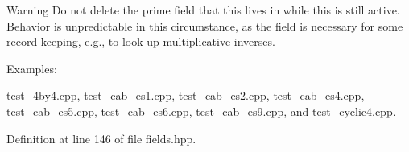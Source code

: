 \begin{DoxyWarning}{Warning}
Do not delete the prime field that {\ttfamily this} lives in while {\ttfamily this} is still active. Behavior is unpredictable in this circumstance, as the field is necessary for some record keeping, e.\+g., to look up multiplicative inverses. 
\end{DoxyWarning}
\begin{Desc}
\item[Examples\+: ]\par
\hyperlink{test_4by4_8cpp-example}{test\+\_\+4by4.\+cpp}, \hyperlink{test_cab_es1_8cpp-example}{test\+\_\+cab\+\_\+es1.\+cpp}, \hyperlink{test_cab_es2_8cpp-example}{test\+\_\+cab\+\_\+es2.\+cpp}, \hyperlink{test_cab_es4_8cpp-example}{test\+\_\+cab\+\_\+es4.\+cpp}, \hyperlink{test_cab_es5_8cpp-example}{test\+\_\+cab\+\_\+es5.\+cpp}, \hyperlink{test_cab_es6_8cpp-example}{test\+\_\+cab\+\_\+es6.\+cpp}, \hyperlink{test_cab_es9_8cpp-example}{test\+\_\+cab\+\_\+es9.\+cpp}, and \hyperlink{test_cyclic4_8cpp-example}{test\+\_\+cyclic4.\+cpp}.\end{Desc}


Definition at line 146 of file fields.\+hpp.

